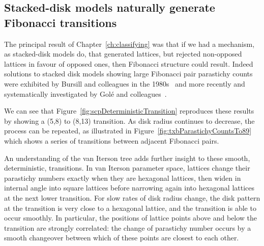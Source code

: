 \clearpage
\subsection{Stacked-disk models naturally generate Fibonacci transitions}
%
The principal result of Chapter~\ref{ch:classifying} was that if we had a mechanism, as stacked-disk models do, that generated lattices, but rejected non-opposed lattices in favour of opposed ones, then Fibonacci structure could result.   
Indeed solutions to stacked disk models showing large Fibonacci pair parastichy counts were exhibited by Bursill and colleagues in the 1980s~\cite{bursillSpiralLatticeConcepts1987,xudongPackingEqualDiscs1989} and more recently and systematically investigated by Gol\'e and colleagues~\cite{goleFibonacciQuasisymmetricPhyllotaxis2016}.

 We can see that Figure~\ref{fig:scpDeterministicTransition} reproduces these results by showing a (5,8) to (8,13) transition.
As disk radius continues to decrease, the process can be repeated, as illustrated in  Figure~\ref{fig:txbParastichyCountsTo89} which shows a series of transitions between adjacent Fibonacci pairs.  
%
\clearpage
{}
%


An understanding of the van Iterson tree adds further insight to these smooth, deterministic, transitions. In van Iterson parameter space, lattices change their parastichy numbers exactly when they are hexagonal lattices, then widen in internal angle into square lattices before narrowing again into hexagonal lattices at the next lower transition.  For slow rates of disk radius change, the disk pattern at the transition is very close to a hexagonal lattice, and the transition is able to occur smoothly. In particular, the positions of lattice points above and below the transition are strongly correlated: the change of parastichy number occurs by a smooth changeover between which of these points are closest to each other. 


